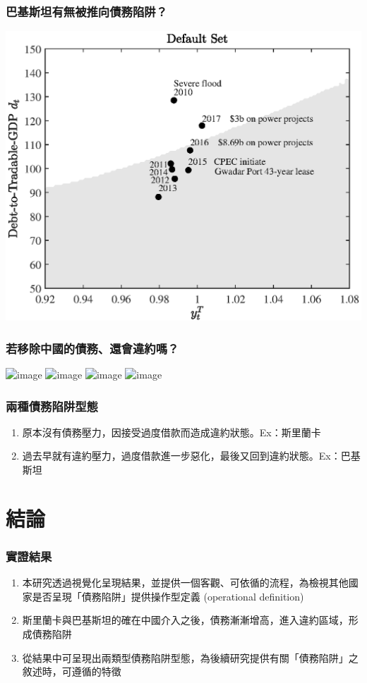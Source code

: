 \documentclass[mathserif]{beamer}
\begin{document}
    \begin{frame}
        \frametitle{巴基斯坦有無被推向債務陷阱？}
        \centering
        \includegraphics[width = 0.8 \textwidth]{fig/default_set_pak_trad_hp_with_china.eps}
    \end{frame}

    \begin{frame}
        \frametitle{若移除中國的債務、還會違約嗎？}
        \centering

        \includegraphics<1>[width = 0.8 \textwidth]{fig/sri_with_china.png}%
        \includegraphics<2>[width = 0.8 \textwidth]{fig/sri_x_china.png}%
        \includegraphics<3>[width = 0.8 \textwidth]{fig/pak_with_china.png}%
        \includegraphics<4>[width = 0.8 \textwidth]{fig/pak_x_china.png}%
    \end{frame}

    \begin{frame}
        \frametitle{兩種債務陷阱型態}

       \begin{enumerate}
        \item 原本沒有債務壓力，因接受過度借款而造成違約狀態。Ex：斯里蘭卡
        \item 過去早就有違約壓力，過度借款進一步惡化，最後又回到違約狀態。Ex：巴基斯坦
       \end{enumerate}

    \end{frame}
    \section{結論}
    \begin{frame}
        \frametitle{實證結果}

        \begin{enumerate}
            \item 本研究透過視覺化呈現結果，並提供一個客觀、可依循的流程，為檢視其他國家是否呈現「債務陷阱」提供操作型定義 (operational definition)
            \item 斯里蘭卡與巴基斯坦的確在中國介入之後，債務漸漸增高，進入違約區域，形成債務陷阱
            \item 從結果中可呈現出兩類型債務陷阱型態，為後續研究提供有關「債務陷阱」之敘述時，可遵循的特徵
        \end{enumerate}

    \end{frame}
\end{document}
